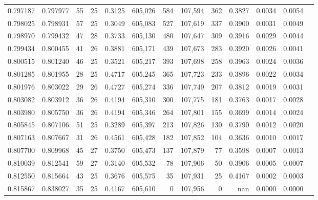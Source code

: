 \begin{tabular}{rrrrrrrrrrrrr}
0.797187 & 0.797977 &  55 &  25 &                                     0.3125 & 605,026 &     584 & 107,594 &     362 & 0.3827 & 0.0034 & 0.0054 \\
0.798025 & 0.798931 &  57 &  25 &                                     0.3049 & 605,083 &     527 & 107,619 &     337 & 0.3900 & 0.0031 & 0.0049 \\
0.798970 & 0.799432 &  47 &  28 &                                     0.3733 & 605,130 &     480 & 107,647 &     309 & 0.3916 & 0.0029 & 0.0044 \\
0.799434 & 0.800455 &  41 &  26 &                                     0.3881 & 605,171 &     439 & 107,673 &     283 & 0.3920 & 0.0026 & 0.0041 \\
0.800515 & 0.801240 &  46 &  25 &                                     0.3521 & 605,217 &     393 & 107,698 &     258 & 0.3963 & 0.0024 & 0.0036 \\
0.801285 & 0.801955 &  28 &  25 &                                     0.4717 & 605,245 &     365 & 107,723 &     233 & 0.3896 & 0.0022 & 0.0034 \\
0.801976 & 0.803022 &  29 &  26 &                                     0.4727 & 605,274 &     336 & 107,749 &     207 & 0.3812 & 0.0019 & 0.0031 \\
0.803082 & 0.803912 &  36 &  26 &                                     0.4194 & 605,310 &     300 & 107,775 &     181 & 0.3763 & 0.0017 & 0.0028 \\
0.803980 & 0.805750 &  36 &  26 &                                     0.4194 & 605,346 &     264 & 107,801 &     155 & 0.3699 & 0.0014 & 0.0024 \\
0.805845 & 0.807106 &  51 &  25 &                                     0.3289 & 605,397 &     213 & 107,826 &     130 & 0.3790 & 0.0012 & 0.0020 \\
0.807163 & 0.807667 &  31 &  26 &                                     0.4561 & 605,428 &     182 & 107,852 &     104 & 0.3636 & 0.0010 & 0.0017 \\
0.807700 & 0.809968 &  45 &  27 &                                     0.3750 & 605,473 &     137 & 107,879 &      77 & 0.3598 & 0.0007 & 0.0013 \\
0.810039 & 0.812541 &  59 &  27 &                                     0.3140 & 605,532 &      78 & 107,906 &      50 & 0.3906 & 0.0005 & 0.0007 \\
0.812550 & 0.815664 &  43 &  25 &                                     0.3676 & 605,575 &      35 & 107,931 &      25 & 0.4167 & 0.0002 & 0.0003 \\
0.815867 & 0.838027 &  35 &  25 &                                     0.4167 & 605,610 &       0 & 107,956 &       0 &    nan & 0.0000 & 0.0000 \\
\bottomrule
\end{tabular}
